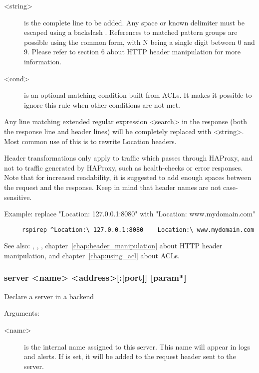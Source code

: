 {\begin{description}
  \item[<string>] is the complete line to be added. Any space or known delimiter
              must be escaped using a backslash \chr{\bslash}. References to matched
              pattern groups are possible using the common \chr{\N} form, with N
              being a single digit between 0 and 9. Please refer to section
              6 about HTTP header manipulation for more information.

  \item[<cond>] is an optional matching condition built from ACLs. It makes it
              possible to ignore this rule when other conditions are not met.
  \end{description}

  Any line matching extended regular expression <search> in the response (both
  the response line and header lines) will be completely replaced with
  <string>. Most common use of this is to rewrite Location headers.

  Header transformations only apply to traffic which passes through HAProxy,
  and not to traffic generated by HAProxy, such as health-checks or error
  responses. Note that for increased readability, it is suggested to add enough
  spaces between the request and the response. Keep in mind that header names
  are not case-sensitive.

  Example: replace "Location: 127.0.0.1:8080" with "Location: www.mydomain.com"
  \begin{verbatim}
     rspirep ^Location:\ 127.0.0.1:8080    Location:\ www.mydomain.com
  \end{verbatim}

  See also: , , , chapter~\ref{chap:header_manipulation}
  about HTTP header manipulation, and chapter~\ref{chap:using_acl} about ACLs.

\subsubsection[server]{server <name> <address>[:[port]] [param*]}


  Declare a server in a backend


  Arguments:
  \begin{description}
  \item[<name>] is the internal name assigned to this server. This name will
              appear in logs and alerts.  If  is
              set, it will be added to the request header sent to the server.


\end{description}}

